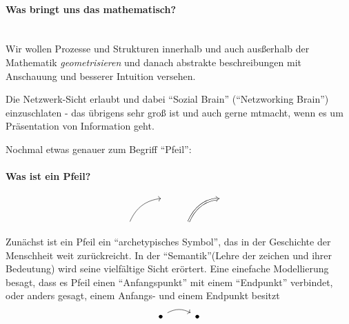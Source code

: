 \paragraph{Was bringt uns das mathematisch?}\mylinebreak\\
Wir wollen Prozesse und Strukturen innerhalb und auch ausßerhalb der Mathematik \emph{geometrisieren} und danach abstrakte beschreibungen mit Anschauung und besserer Intuition versehen.
\begin{remark}
    Die Netzwerk-Sicht erlaubt und dabei ``Sozial Brain'' (``Netzworking Brain'') einzuschlaten - das übrigens sehr groß ist und auch gerne mtmacht, wenn es um Präsentation von Information geht.
\end{remark}
Nochmal etwas genauer zum Begriff ``Pfeil'':
\paragraph{Was ist ein Pfeil?}
$$
\begin{tikzcd}
                            & \quad \\
\quad \arrow[ru, bend left] &      
\end{tikzcd} 
\begin{tikzcd}
                                                       & \quad \\
\quad \arrow[ru, Rightarrow, bend left] &      
\end{tikzcd}
$$
Zunächst ist ein Pfeil ein ``archetypisches Symbol'', das in der Geschichte der Menschheit weit zurückreicht. In der ``Semantik''(Lehre der zeichen und ihrer Bedeutung) wird seine vielfältige Sicht erörtert. Eine einefache Modellierung besagt, dass es Pfeil einen ``Anfangspunkt'' mit einem ``Endpunkt'' verbindet, oder anders gesagt, einem Anfangs- und einem Endpunkt besitzt
$$
\begin{tikzcd}
    \bullet \arrow[r, bend left] & \bullet
\end{tikzcd}
$$
